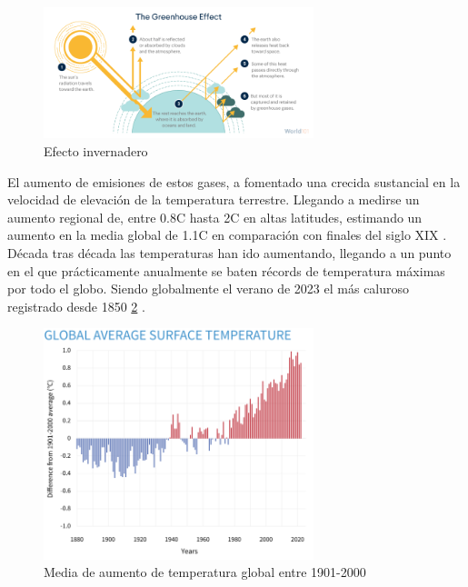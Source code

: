 \begin{figure} [H]
	\centering
	\includegraphics[width=0.7\textwidth]{fig/climate-change_greenhouse-effect_steps.png}
	\caption[Efecto invernadero]{Efecto invernadero \footnotemark}
	\label{fig:ej17}
\end{figure}

El aumento de emisiones de estos gases, a fomentado una crecida sustancial en la velocidad de elevación de la temperatura terrestre. Llegando a medirse un aumento regional de, entre 0.8\textdegree C hasta 2\textdegree C en altas latitudes, estimando un aumento en la media global de 1.1\textdegree C en comparación con finales del siglo XIX \cite{ruddiman2003anthropogenic}.\newline
\newline
Década tras década las temperaturas han ido aumentando, llegando a un punto en el que prácticamente anualmente se baten récords de temperatura máximas por todo el globo. Siendo globalmente el verano de 2023 el más caluroso registrado desde 1850 \ref{fig:ej18} \cite{NCEIWeb}.

\begin{figure} [H]
	\centering
	\includegraphics[width=0.7\textwidth]{fig/ClimateDashboard-global-surface-temperature-graph-20230118-1400px.png}
	\caption[Media de aumento de temperatura global entre 1901-2000]{Media de aumento de temperatura global entre 1901-2000 \footnotemark}
	\label{fig:ej18}
\end{figure}

